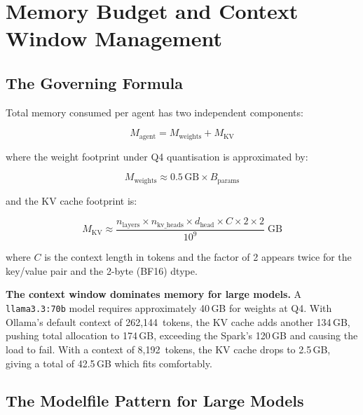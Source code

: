\section{Memory Budget and Context Window Management}
\label{sec:memory}

\subsection{The Governing Formula}

Total memory consumed per agent has two independent components:

\begin{equation}
M_{\text{agent}} = M_{\text{weights}} + M_{\text{KV}}
\label{eq:memory}
\end{equation}

\noindent where the weight footprint under Q4 quantisation is
approximated by:

\begin{equation}
M_{\text{weights}} \approx 0.5\,\text{GB} \times B_{\text{params}}
\label{eq:weights}
\end{equation}

\noindent and the KV cache footprint is:

\begin{equation}
M_{\text{KV}} \approx \frac{n_{\text{layers}} \times n_{\text{kv\_heads}}
  \times d_{\text{head}} \times C \times 2 \times 2}{10^9}\;\text{GB}
\label{eq:kvcache}
\end{equation}

\noindent where $C$ is the context length in tokens and the factor of 2
appears twice for the key/value pair and the 2-byte (BF16) dtype.

\begin{warningbox}
\textbf{The context window dominates memory for large models.} A
\texttt{llama3.3:70b} model requires approximately 40\,GB for weights
at Q4. With Ollama's default context of 262,144~tokens, the KV cache
adds another 134\,GB, pushing total allocation to 174\,GB, exceeding
the Spark's 120\,GB and causing the load to fail. With a context of
8,192~tokens, the KV cache drops to 2.5\,GB, giving a total of
42.5\,GB which fits comfortably.
\end{warningbox}

\subsection{The Modelfile Pattern for Large Models}

